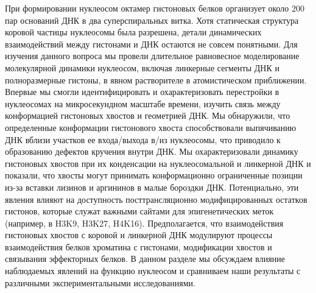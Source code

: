 
    При формировании нуклеосом октамер гистоновых белков организует около 200 пар оснований ДНК в два суперспиральных витка. Хотя статическая структура коровой частицы нуклеосомы была разрешена, детали динамических взаимодействий между гистонами и ДНК остаются не совсем понятными. Для изучения данного вопроса мы провели длительное равновесное моделирование молекулярной динамики нуклеосом, включая линкерные сегменты ДНК и полноразмерные гистоны, в явном растворителе в атомистическом приближении. Впервые мы смогли идентифицировать и охарактеризовать перестройки в нуклеосомах на микросекундном масштабе времени, изучить связь между конформацией гистоновых хвостов и геометрией ДНК. Мы обнаружили, что определенные конформации гистонового хвоста способствовали выпячиванию ДНК вблизи участков ее входа/выхода в/из нуклеосомы, что приводило к образованию дефектов кручения внутри ДНК. Мы охарактеризовали динамику гистоновых хвостов при их конденсации на нуклеосомальной и линкерной ДНК и показали, что хвосты могут принимать конформационно ограниченные позиции из-за вставки  лизинов и аргининов в малые бороздки ДНК. Потенциально, эти явления влияют на доступность посттрансляционно модифицированных остатков гистонов, которые служат важными сайтами для эпигенетических меток (например, в H3K9, H3K27, H4K16). Предполагается, что взаимодействия гистоновых хвостов с коровой и линкерной ДНК модулируют процессы взаимодействия белков хроматина с гистонами, модификации хвостов и связывания эффекторных белков. В данном разделе мы обсуждаем влияние наблюдаемых явлений на функцию нуклеосом и сравниваем наши результаты с различными экспериментальными исследованиями.

